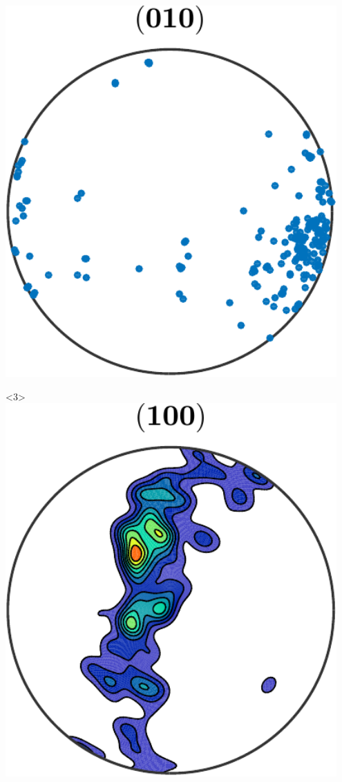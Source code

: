 \documentclass[compress]{beamer}
\begin{document}
\begin{frame}[fragile]
\begin{columns}
\begin{column}{3.5cm}
\begin{onlyenv}
        \medskip

        \includegraphics[width=0.95\textwidth]{pic/pfSimple010}
      \end{onlyenv}

      \begin{onlyenv}<3>
        \includegraphics[width=0.95\textwidth]{pic/pfSimple100Smooth}


\end{onlyenv}
\end{column}
\end{columns}
\end{frame}
\end{document}
